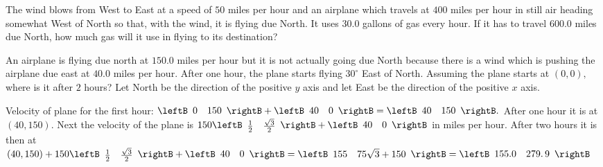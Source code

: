 \begin{enumialphparenastyle}
\begin{ex} The wind blows from West to East at a speed of $50$ miles per hour and
an airplane which travels at $400$ miles per hour in still air heading
somewhat West of North so that, with the wind, it is flying due North. It
uses $30.0$ gallons of gas every hour. If it has to travel $600.0$ miles due
North, how much gas will it use in flying to its destination? \vspace{1mm}
\end{ex}

\begin{ex} An airplane is flying due north at $150.0$ miles per hour but it is
not actually going due North because there is a wind which is pushing the
airplane due east at $40.0$ miles per hour. After one hour, the plane starts
flying $30^{\circ }$ East of North. Assuming the plane starts at $\left(
0,0\right) ,$ where is it after $2$ hours? Let North be the direction of the
positive $y$ axis and let East be the direction of the positive $x$ axis.
\vspace{1mm}
\begin{sol}
 Velocity of plane for the first hour: $\leftB \begin{array}{cc} 
0 & 150
\end{array}
\rightB  + \leftB \begin{array}{cc}
40 & 0
\end{array}
\rightB =\leftB
\begin{array}{cc}
40 & 150
\end{array}
\rightB .$ After one hour it is at $\left( 40,150\right) .$ Next the
velocity of the plane is $150\leftB \begin{array}{cc}
 \frac{1}{2} & \frac{\sqrt{3}}{2}
\end{array}
\rightB
+\leftB
\begin{array}{cc}
 40 & 0
\end{array}
\rightB $ in miles per hour. After two hours it is then at 
$\left( 40,150\right) + 150\leftB \begin{array}{cc}
 \frac{1}{2} & \frac{\sqrt{3}}{2}
\end{array}
\rightB
+\leftB
\begin{array}{cc}
 40 & 0
\end{array}
\rightB  =  \leftB
\begin{array}{cc}
155 & 75\sqrt{3}+150
\end{array}
\rightB = \leftB
\begin{array}{cc}
155.0 & 279.\,\allowbreak 9
\end{array}
\rightB $
\end{sol}
\end{ex}


\end{enumialphparenastyle}
